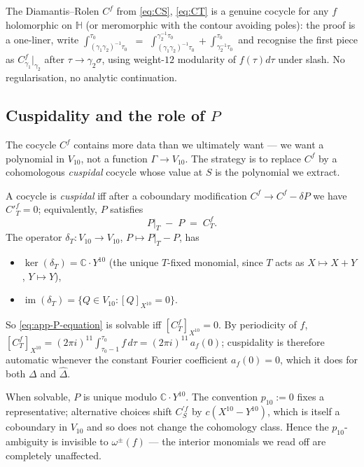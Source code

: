 \documentclass[11pt,letterpaper]{article}
\newcommand{\HH}{\mathbb{H}}
\newcommand{\CC}{\mathbb{C}}
\newcommand{\Dhat}{\widehat{\Delta}}
\begin{document}
The Diamantis--Rolen $C^f$ from \eqref{eq:CS}, \eqref{eq:CT} is a genuine
cocycle for any $f$ holomorphic on $\HH$ (or meromorphic with the contour
avoiding poles): the proof is a one-liner, write
\(\int_{(\gamma_1\gamma_2)^{-1}\tau_0}^{\tau_0}\)
$=$
\(\int_{(\gamma_1\gamma_2)^{-1}\tau_0}^{\gamma_2^{-1}\tau_0}
   + \int_{\gamma_2^{-1}\tau_0}^{\tau_0}\)
and recognise the first piece as $C^f_{\gamma_1}\big|_{\gamma_2}$ after
$\tau \to \gamma_2\sigma$, using weight-$12$ modularity of $f(\tau)d\tau$
under slash.  No regularisation, no analytic continuation.

\subsection{Cuspidality and the role of $P$}\label{app:cuspidality}

The cocycle $C^f$ contains more data than we ultimately want --- we want a
polynomial in $V_{10}$, not a function $\Gamma \to V_{10}$.  The strategy
is to replace $C^f$ by a cohomologous \emph{cuspidal} cocycle whose value
at $S$ is the polynomial we extract.

A cocycle is \emph{cuspidal} iff after a coboundary modification
$C^f \to C^f - \delta P$ we have $C'^f_T = 0$; equivalently, $P$ satisfies
\begin{equation}\label{eq:app-P-equation}
  P\big|_T \;-\; P \;=\; C^f_T. \tag{$\star$}
\end{equation}
The operator $\delta_T \colon V_{10} \to V_{10}$, $P \mapsto P|_T - P$, has
\begin{itemize}
  \item $\ker(\delta_T) = \CC \cdot Y^{10}$ (the unique $T$-fixed monomial, since $T$ acts as $X \mapsto X+Y$, $Y \mapsto Y$),
  \item $\operatorname{im}(\delta_T) = \{Q \in V_{10} : [Q]_{X^{10}} = 0\}$.
\end{itemize}
So \eqref{eq:app-P-equation} is solvable iff $[C^f_T]_{X^{10}} = 0$.  By
periodicity of $f$, $[C^f_T]_{X^{10}} = (2\pi i)^{11}\int_{\tau_0-1}^{\tau_0}\!f\,d\tau
= (2\pi i)^{11}\,a_f(0)$; cuspidality is therefore automatic whenever the
constant Fourier coefficient $a_f(0) = 0$, which it does for both $\Delta$ and $\Dhat$.

When solvable, $P$ is unique modulo $\CC\cdot Y^{10}$.  The convention
$p_{10} := 0$ fixes a representative; alternative choices shift $C^{\prime f}_S$
by $c(X^{10}-Y^{10})$, which is itself a coboundary in $V_{10}$ and so does
not change the cohomology class.  Hence the $p_{10}$-ambiguity is invisible
to $\omega^\pm(f)$ --- the interior monomials we read off are completely
unaffected.
\end{document}
